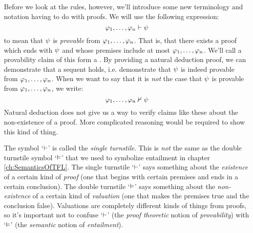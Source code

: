 Before we look at the rules, however, we'll introduce some new terminology and notation having to do with proofs.  We will use the following expression:
$$\mathcal{\varphi}_1, \ldots, \mathcal{\varphi}_n \vdash \mathcal{\psi}$$
to mean that $\mathcal{\psi}$ is \emph{provable} from $\mathcal{\varphi}_1, \ldots, \mathcal{\varphi}_n$.  That is, that there exists a proof which ends with $\mathcal{\psi}$ and whose premises include at most $\mathcal{\varphi}_1, \ldots, \mathcal{\varphi}_n$. We'll call a provability claim of this form a .  By providing a natural deduction proof, we can demonstrate that a sequent holds, i.e. demonstrate that $\mathcal{\psi}$ is indeed provable from $\mathcal{\varphi}_1, \ldots, \mathcal{\varphi}_n$.  When we want to say that it is \emph{not} the case that $\mathcal{\psi}$ is provable from $\mathcal{\varphi}_1, \ldots, \mathcal{\varphi}_n$, we write:
$$\mathcal{\varphi}_1, \ldots, \mathcal{\varphi}_n \nvdash \mathcal{\psi}$$
Natural deduction does not give us a way to verify claims like these about the non-existence of a proof. More complicated reasoning would be required to show this kind of thing.


The symbol `$\vdash$' is called the \emph{single turnstile}.  This is \emph{not} the same as the double turnstile symbol `$\vDash$' that we used to symbolize entailment in chapter \ref{ch:SemanticsOfTFL}. The single turnstile `$\vdash$' says something about the \emph{existence} of a certain kind of \emph{proof} (one that begins with certain premises and ends in a certain conclusion).  The double turnstile `$\vDash$' says something about the \emph{non-existence} of a certain kind of \emph{valuation} (one that makes the premises true and the conclusion false).  Valuations are completely different kinds of things from proofs, so it's important not to confuse `$\vdash$' (the \emph{proof theoretic} notion of \emph{provability}) with `$\vDash$' (the \emph{semantic} notion of \emph{entailment}).

